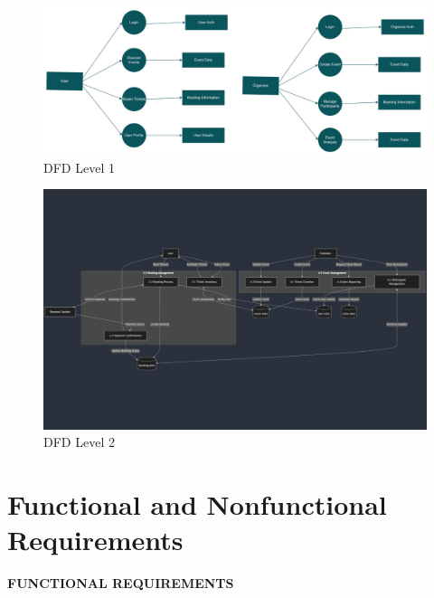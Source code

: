 \documentclass[twoside,a4paper,openright]{report} %
\begin{document}
\begin{figure}[H]
	\centering
	\includegraphics[width=\textwidth]{dfd2.jpg}
	\caption{DFD Level 1}
	\label{fig:dfd1}
\end{figure}

\begin{figure}[H]
	\centering
	\includegraphics[width=\textwidth]{dfd3.jpg}
	\caption{DFD Level 2}
	\label{fig:dfd2}
\end{figure}
\fi
\newpage
\section{Functional and Nonfunctional Requirements}

\textbf{FUNCTIONAL REQUIREMENTS}
\end{document}
